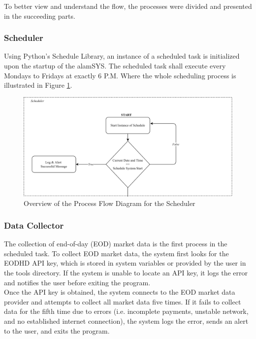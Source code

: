 To better view and understand the flow, 
the processes were divided and presented in the succeeding parts.

\subsubsection{Scheduler}
\label{subsubsc:scheduler}
Using Python's Schedule Library, an instance of a scheduled task
is initialized upon the startup of the alamSYS. The scheduled task
shall execute every Mondays to Fridays at exactly 6 P.M. Where
the whole scheduling process is illustrated in Figure \ref{fig:process_flowchart_scheduler}.
\hfill \\
\begin{figure}[ht]
    \centering
    \includegraphics[width=1\textwidth]{./assets/Chapter_3/PFC/ProcessFlowchart_Scheduler.png}
    \caption{Overview of the Process Flow Diagram for the Scheduler}
    \label{fig:process_flowchart_scheduler}
\end{figure}
\FloatBarrier

\subsubsection{Data Collector}
\label{subsubsec:data_collector}
The collection of end-of-day (EOD) market data is the first process in the scheduled task.
To collect EOD market data, the system first looks for the EODHD API key, 
which is stored in system variables or provided by the user in the tools directory. 
If the system is unable to locate an API key, it logs the error and notifies the user before 
exiting the program.
\hfill \\

Once the API key is obtained, the system connects to the EOD market data provider and 
attempts to collect all market data five times. If it fails to collect data 
for the fifth time due to errors (i.e. incomplete payments, unstable network, and no established internet connection), 
the system logs the error, sends an alert to the user, and exits the program.
\hfill \\

